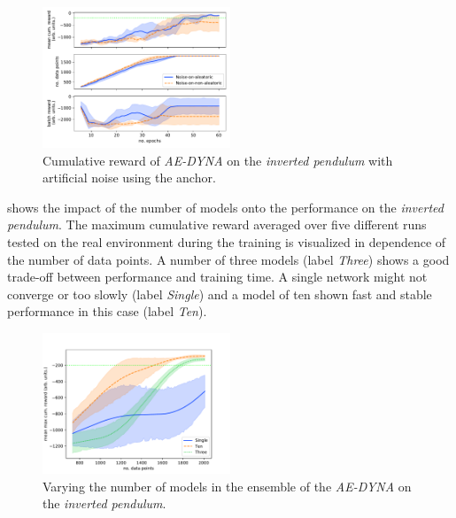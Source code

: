 \documentclass[
reprint,
amsmath,amssymb,amsfonts,clevref,
aps,
prstab,
]{revtex4-2}
\begin{document}
	\begin{figure}[!h]
		\centering
		\includegraphics*[width=0.5\textwidth]{Figures/Comparison_noise_ae_dyna}
		\caption{Cumulative reward of \emph{AE-DYNA} on the \emph{inverted pendulum} with artificial noise using the anchor.}
		\label{fig:comparsion_noise_ae_dyna}
	\end{figure}
 shows the impact of the number of models onto the performance on the \emph{inverted pendulum}. The maximum cumulative reward averaged over five different runs tested on the real environment during the training is visualized in dependence of the number of data points. A number of three models (label \emph{Three}) shows a good trade-off between performance and training time. A single network might not converge or too slowly (label \emph{Single}) and a model of ten shown fast and stable performance in this case (label \emph{Ten}).
\begin{figure}[!h]
	\centering
	\includegraphics*[width=0.5\textwidth]{Figures/Compare_models_sizes}
	\caption{Varying the number of models in the ensemble of the \emph{AE-DYNA} on the \emph{inverted pendulum}.}
	\label{fig:Compare_models_sizes}
\end{figure}
\end{document}
